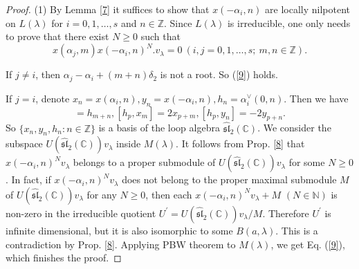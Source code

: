 \documentclass[11pt]{amsproc}
\theoremstyle{definition}
\theoremstyle{remark}
\numberwithin{equation}{section} \errorcontextlines=0
\begin{document}
\begin{proof}
(1) By Lemma \ref{7} it suffices to show that $x(-\alpha_i,n)$ are
locally nilpotent on $L(\lambda)$ for $i=0,1,\ldots,s$ and
$n\in\mathbb{Z}$. Since $L(\lambda)$ is irreducible, one only needs to
prove that there exist $ N\geq 0$ such
that
\begin{equation}\label{9}
x(\alpha_j,m)x(-\alpha_i,n)^{N}.v_{\lambda}=0~(i,j=0,1,\ldots,s;~
m,n\in\mathbb{Z}).
\end{equation}

If $j\neq i$, then $\alpha_j-\alpha_i+(m+n)\delta_2$ is not a root.
So (\ref{9}) holds.

If $j=i$, denote $
x_n=x(\alpha_i,n), y_n=x(-\alpha_i,n),h_{n}=\alpha_i^{\vee}(0,n)$.
Then we have
\begin{equation*}
[x_m,y_n]=h_{m+n}, [h_p,x_m]=2x_{p+m}, [h_p,y_n]=-2y_{p+n}.
\end{equation*}
So $\{x_n,y_n,h_n: n\in\mathbb{Z}\}$ is a basis of the loop algebra
$\hat{\mathfrak{sl}}_2(\mathbb C)$. We consider the subspace
$U(\hat{\mathfrak{sl}}_2(\mathbb C))v_{\lambda}$ inside
$M(\lambda)$. It follows from Prop. \ref{8} that
$x(-\alpha_i,n)^{N}v_{\lambda}$ belongs to a proper submodule of
$U(\hat{\mathfrak{sl}}_2(\mathbb C))v_{\lambda}$ for some $N\geq 0$.
In fact, if $x(-\alpha_i,n)^{N}v_{\lambda}$ does not
belong to the proper maximal submodule $M$ of $U(\hat{\mathfrak{sl}}_2(\mathbb
C))v_{\lambda}$ for any $N\geq 0$,
then each $x(-\alpha_i,n)^{N}v_{\lambda}+M$ $(N\in\mathbb N)$ is non-zero in
the irreducible quotient $U^{'}=U(\hat{\mathfrak{sl}}_2(\mathbb C))v_{\lambda}/M$. Therefore
$U^{'}$ is infinite dimensional, but it is also isomorphic to some $B(a,{\lambda})$. This
is a contradiction by Prop. \ref{8}. Applying PBW theorem to $M(\lambda)$, we get
Eq. (\ref{9}), which finishes the proof.


\end{proof}
\end{document}
